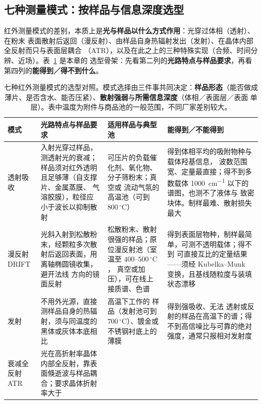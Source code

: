 \subsection{七种测量模式：按样品与信息深度选型}

红外测量模式的差别，本质上是\textbf{光与样品以什么方式作用}：光穿过体相（透射）、在粉末
表面散射后返回（漫反射）、由样品自身热辐射发出（发射）、在晶体内部全反射而只与表面层耦合
（ATR），以及在此之上的三种特殊实现（合频、时间分辨、近场）。表~\ref{tab:modes} 是本章的
选型骨架：先看第二列的\textbf{光路特点与样品要求}，再看第四列的\textbf{能得到／得不到什么}。

\begin{table}[tbp]
\centering
\caption{七种红外测量模式的选型对照。模式选择由三件事共同决定：\textbf{样品形态}（能否做成
薄片、是否含水、能否压紧）、\textbf{散射强弱}与\textbf{所需信息深度}（体相／表面层／表面
单层）。表中温度为附件与商品池的一般范围，不同厂家差别较大。}
\label{tab:modes}
{\srcsize
\begin{tabularx}{\textwidth}{@{}l >{\raggedright\arraybackslash}X >{\raggedright\arraybackslash}X >{\raggedright\arraybackslash}X@{}}
\toprule
模式 & 光路特点与样品要求 & 适用样品与典型池 & 能得到／不能得到 \\
\midrule
透射吸收 & 入射光穿过样品，测透射光的衰减；样品须对红外透明且足够薄（自支撑片、金属蒸膜、
气溶胶膜），粒径应小于波长以抑制散射 & 可压片的负载催化剂、氧化物、分子筛粉末；真空或
流动气氛的高温池（可到 $800\,^{\circ}\mathrm{C}$） & 得到体相平均的吸附物种与载体羟基信息，
波数范围宽、定量最直接；得不到多数载体 \qty{1000}{cm^{-1}} 以下的谱图，也测不了液体与
致密块体。制样最难、散射损失最大 \\
漫反射 DRIFT & 光斜入射到松散粉末，经颗粒多次散射后返回表面，用离轴椭圆镜收集，避开法线
方向的镜面反射 & 松散粉末、散射很强的样品；原位漫反射池（室温至 $400$--$500\,^{\circ}\mathrm{C}$，
真空或加压），可在线上接质谱、色谱 & 得到表面层物种，制样最简单，可测不透明载体；得不到
可直接互比的定量结果——须经 Kubelka--Munk 变换，且基线随粒度与装填状态漂移 \\
发射 & 不用外光源，直接测样品自身的热辐射，须与同温度的黑体或灰体本底相比 & 高温下工作的
样品（发射池可到 $700\,^{\circ}\mathrm{C}$）、镀金或不锈钢衬底上的薄膜 & 得到强吸收、无法
透射或反射的样品在高温下的谱；得不到高信噪比与可靠的绝对强度，通常只报相对发射度 \\
衰减全反射 ATR & 光在高折射率晶体内部全反射，靠表面倏逝波与样品耦合；要求晶体折射率大于

\end{tabularx}}
\end{table}
